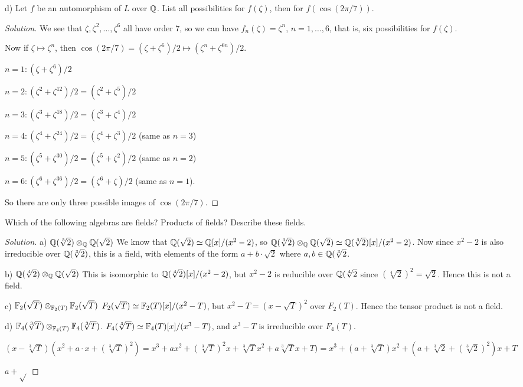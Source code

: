 \begin{que}
d) Let $f$ be an automorphism of $L$ over $\mathbb{Q}$. List all possibilities for $f(\zeta)$, then for $f(\cos(2\pi/7))$.
\begin{proof}[Solution]
We see that $\zeta, \zeta^2, \dotsc, \zeta^6$ all have order $7$, so we can have $f_n(\zeta) = \zeta^n$, $n = 1, \dotsc, 6$, that is, six possibilities for $f(\zeta)$.

Now if $\zeta \mapsto \zeta^n$, then $\cos(2 \pi /7) = (\zeta + \zeta^{6}) / 2 \mapsto (\zeta^n + \zeta^{6n}) / 2$. 

$n = 1: (\zeta + \zeta^6) / 2$

$n = 2: (\zeta^2 + \zeta^{12}) / 2 = (\zeta^2 + \zeta^5) / 2$

$n = 3: (\zeta^3 + \zeta^{18}) / 2 = (\zeta^3 + \zeta^4) / 2$

$n = 4: (\zeta^4 + \zeta^{24}) / 2 = (\zeta^4 + \zeta^3) / 2$ (same as $n = 3$)

$n = 5: (\zeta^5 + \zeta^{30}) / 2 = (\zeta^5 + \zeta^2) / 2$ (same as $n = 2$)

$n = 6: (\zeta^6 + \zeta^{36}) / 2 = (\zeta^6 + \zeta) / 2$ (same as $n = 1$).

So there are only three possible images of $\cos(2 \pi / 7)$.
\end{proof}
\end{que}

\begin{que}
Which of the following algebras are fields? Products of fields? Describe these fields.

\begin{proof}[Solution]
a) $\mathbb{Q}(\sqrt[3]{2}) \otimes_{\mathbb{Q}} \mathbb{Q}(\sqrt{2})$
We know that $\mathbb{Q}(\sqrt{2}) \simeq \mathbb{Q}[x] / (x^2 - 2)$, so $\mathbb{Q}(\sqrt[3]{2}) \otimes_{\mathbb{Q}} \mathbb{Q}(\sqrt{2}) \simeq \mathbb{Q}(\sqrt[3]{2})[x] / (x^2 - 2)$. Now since $x^2 - 2$ is also irreducible over $\mathbb{Q}(\sqrt[3]{2})$, this is a field, with elements of the form $a + b \cdot \sqrt{2}$ where $a, b \in \mathbb{Q}(\sqrt[3]{2}$.

b) $\mathbb{Q}(\sqrt[4]{2}) \otimes_{\mathbb{Q}} \mathbb{Q}(\sqrt{2})$
This is isomorphic to $\mathbb{Q}(\sqrt[4]{2})[x] / (x^2 - 2)$, but $x^2 - 2$ is reducible over $\mathbb{Q}(\sqrt[4]{2}$ since $(\sqrt[4]{2})^2 = \sqrt{2}$. Hence this is not a field.

c) $\mathbb{F}_2(\sqrt{T}) \otimes_{\mathbb{F}_2(T)} \mathbb{F}_2(\sqrt{T})$
$F_2(\sqrt{T}) \simeq \mathbb{F}_2(T)[x] / (x^2 - T)$, but $x^2 - T = (x - \sqrt{T})^2$ over $F_2(T)$. Hence the tensor product is not a field.

d) $\mathbb{F}_4(\sqrt[3]{T}) \otimes_{\mathbb{F}_4(T)} \mathbb{F}_4(\sqrt[3]{T})$.
$F_4(\sqrt[3]{T}) \simeq \mathbb{F}_4(T)[x] / (x^3 - T)$, and $x^3 - T$ is irreducible over $F_4(T)$.

$(x - \sqrt[3]{T})(x^2 + a \cdot x + (\sqrt[3]{T})^2) = x^3 + a x^2 + (\sqrt[3]{T})^2 x + \sqrt[3]{T} x^2 + a \sqrt[3]{T} x + T) = x^3 + (a + \sqrt[3]{T}) x^2 + (a + \sqrt[3]{2} + (\sqrt[3]{2})^2) x + T$

$a + \sqrt{}$
\end{proof}
\end{que}